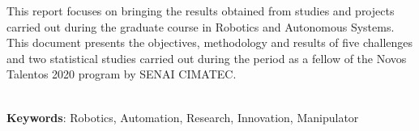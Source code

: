 \begin{thesisabastract}
This report focuses on bringing the results obtained from studies and projects carried out during the graduate course in Robotics and Autonomous Systems. This document presents the objectives, methodology and results of five challenges and two statistical studies carried out during the period as a fellow of the Novos Talentos 2020 program by SENAI CIMATEC.

\ \\


\textbf{Keywords}: Robotics, Automation, Research, Innovation, Manipulator

\end{thesisabastract}
